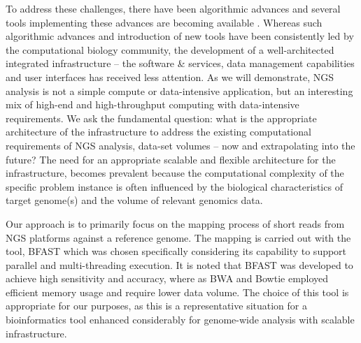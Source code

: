 \documentclass{sig-alternate}
\begin{document}

To address these challenges, there have been algorithmic advances and
several tools implementing these advances are becoming available
\cite{trapnell2009,bfast2009,scheibye-alsing2009,pepke2009,samtools}.
Whereas such algorithmic advances and introduction of new tools have
been consistently led by the computational biology community, the
development of a well-architected integrated infrastructure -- the
software \& services, data management capabilities and user interfaces
has received less attention.  As we will demonstrate, NGS analysis is
not a simple compute or data-intensive application, but an interesting
mix of high-end and high-throughput computing with data-intensive
requirements.  We ask the fundamental question: what is the
appropriate architecture of the infrastructure to address the existing
computational requirements of NGS analysis, data-set volumes -- now
and extrapolating into the future?  The need for an appropriate
scalable and flexible architecture for the infrastructure, becomes
prevalent because the computational complexity of the specific problem
instance is often influenced by the biological characteristics of 
target genome(s) and the volume of relevant genomics data.


Our approach is to primarily focus on the mapping process of short
reads from NGS platforms against a reference genome.  The mapping is
carried out with the tool, BFAST\cite{bfast2009, bfast2009b} which was
chosen specifically considering its capability to support parallel and
multi-threading execution.
It is noted that BFAST was developed to achieve high sensitivity and accuracy, where as BWA and Bowtie employed efficient memory usage and require lower data volume\cite{bfast2009}.
 The choice of this tool is appropriate for our purposes, as this %
is a representative situation for a bioinformatics tool enhanced
considerably for genome-wide analysis with scalable infrastructure.
\end{document}
